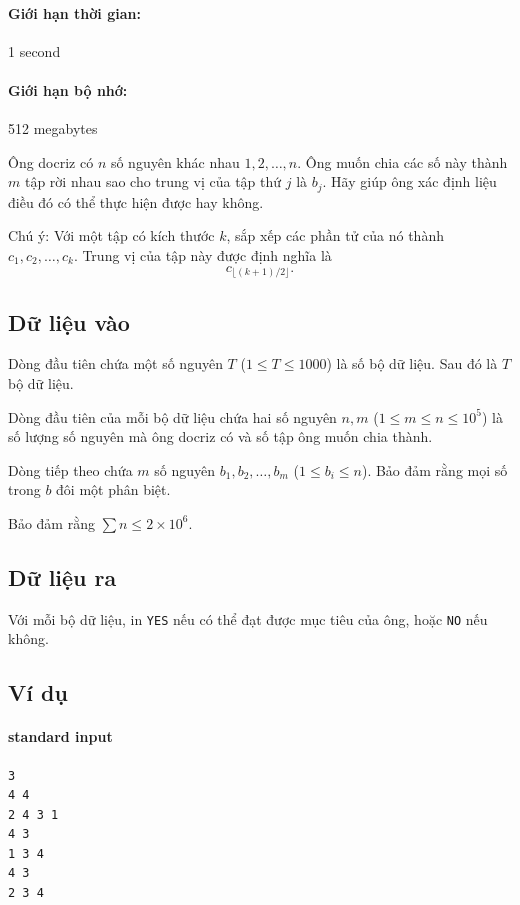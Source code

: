 \documentclass[11pt]{article}
\begin{document}
\paragraph{Giới hạn thời gian:} 1 second
\paragraph{Giới hạn bộ nhớ:} 512 megabytes

Ông docriz có \(n\) số nguyên khác nhau \(1,2,\ldots,n\). Ông muốn chia các
số này thành \(m\) tập rời nhau sao cho trung vị của tập thứ \(j\) là \(b_j\).
Hãy giúp ông xác định liệu điều đó có thể thực hiện được hay không.

Chú ý: Với một tập có kích thước \(k\), sắp xếp các phần tử của nó thành
\(c_1,c_2,\ldots,c_k\). Trung vị của tập này được định nghĩa là
\[
  c_{\lfloor (k+1)/2\rfloor}.
\]

\subsection*{Dữ liệu vào}

Dòng đầu tiên chứa một số nguyên \(T\) (\(1\le T\le 1000\)) là số bộ dữ liệu.
Sau đó là \(T\) bộ dữ liệu.

Dòng đầu tiên của mỗi bộ dữ liệu chứa hai số nguyên \(n,m\)
(\(1\le m\le n\le 10^5\)) là số lượng số nguyên mà ông docriz có và số tập
ông muốn chia thành.

Dòng tiếp theo chứa \(m\) số nguyên \(b_1,b_2,\ldots,b_m\) (\(1\le b_i\le
n\)). Bảo đảm rằng mọi số trong \(b\) đôi một phân biệt.

Bảo đảm rằng \(\sum n\le 2\times 10^6\).

\subsection*{Dữ liệu ra}

Với mỗi bộ dữ liệu, in \texttt{YES} nếu có thể đạt được mục tiêu của ông,
hoặc \texttt{NO} nếu không.

\subsection*{Ví dụ}

\paragraph{standard input}
\begin{verbatim}
3
4 4
2 4 3 1
4 3
1 3 4
4 3
2 3 4
\end{verbatim}
\end{document}
